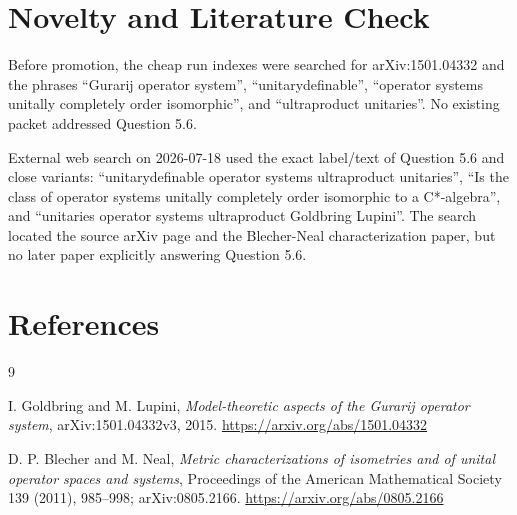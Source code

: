 \documentclass[11pt]{article}
\begin{document}
\section*{Novelty and Literature Check}

Before promotion, the cheap run indexes were searched for arXiv:1501.04332 and the phrases ``Gurarij operator system'', ``unitarydefinable'', ``operator systems unitally completely order isomorphic'', and ``ultraproduct unitaries''.  No existing packet addressed Question 5.6.

External web search on 2026-07-18 used the exact label/text of Question 5.6 and close variants: ``unitarydefinable operator systems ultraproduct unitaries'', ``Is the class of operator systems unitally completely order isomorphic to a C*-algebra'', and ``unitaries operator systems ultraproduct Goldbring Lupini''.  The search located the source arXiv page and the Blecher-Neal characterization paper, but no later paper explicitly answering Question 5.6.

\section*{References}

\begin{thebibliography}{9}

I. Goldbring and M. Lupini,
\emph{Model-theoretic aspects of the Gurarij operator system},
arXiv:1501.04332v3, 2015.
\url{https://arxiv.org/abs/1501.04332}

D. P. Blecher and M. Neal,
\emph{Metric characterizations of isometries and of unital operator spaces and systems},
Proceedings of the American Mathematical Society 139 (2011), 985--998;
arXiv:0805.2166.
\url{https://arxiv.org/abs/0805.2166}

\end{thebibliography}
\end{document}
